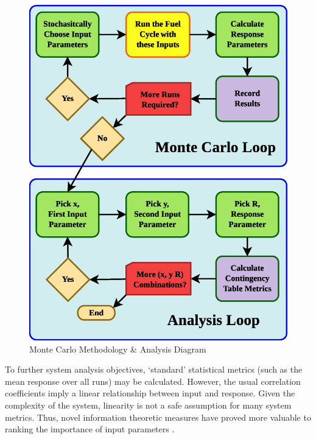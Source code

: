 \documentclass[preprint,12pt]{elsarticle}
\begin{document}
\begin{figure}[htbp]
\begin{center}
\includegraphics[scale=0.70]{MonteCarloMethodology.eps}
\caption{Monte Carlo Methodology \& Analysis Diagram}
\label{mcmethod}
\end{center}
\end{figure}

To further system analysis objectives, `standard' statistical metrics (such as the mean response
over all runs) may be calculated.  However, the usual correlation coefficients imply a linear
relationship between input and response.  Given the complexity of the system, linearity is not
a safe assumption for many system metrics.  Thus, novel information theoretic measures have
proved more valuable to ranking the importance of input parameters \cite{Liu2006}.
\end{document}
